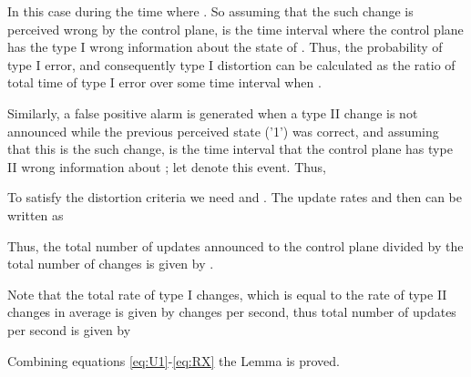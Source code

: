 \documentclass[conference]{IEEEtran}
\theoremstyle{plain}
\theoremstyle{remark}
\begin{document}
In this case  during the time where . So assuming that the  such change is perceived wrong by the control plane,  is the time interval where the control plane has the type I wrong information about the state of . Thus, the probability of type I error, and consequently type I distortion can be calculated as the ratio of total time of type I error over some time interval  when .


Similarly, a false positive alarm is generated when a type II change is not announced while the previous perceived state ('1') was correct, and assuming that this is the  such change,  is the time interval that the control plane has type II wrong information about ; let  denote this event. Thus,


To satisfy the distortion criteria we need  and . The update rates  and  then can be written as


Thus, the total number of updates announced to the control plane divided by the total number of changes is given by .

Note that the total rate of type I changes, which is equal to the rate of type II changes in average is given by  changes per second, thus total number of updates per second is given by


Combining equations \ref{eq:U1}-\ref{eq:RX} the Lemma is proved.
\end{document}
